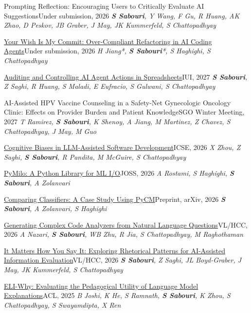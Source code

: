   \cventry
    {Prompting Reflection: Encouraging Users to Critically Evaluate AI Suggestions}{Under submission, 2026}
    {\textit{\textbf{S Sabouri}, Y Wang, F Gu, R Huang, AK Zhao, D Peskov, JB Graber, J May, JK Kummerfeld, S Chattopadhyay}}

  \cventry
    {\href{https://arxiv.org/abs/2610.36346}{Your Wish Is My Commit: Over-Compliant Refactoring in AI Coding Agents}}{Under submission, 2026}
    {\textit{H Jiang*, \textbf{S Sabouri}*, S Haghighi, S Chattopadhyay}}

  \cventry
    {\href{https://arxiv.org/abs/2604.20070}{Auditing and Controlling AI Agent Actions in Spreadsheets}}{IUI, 2027}
    {\textit{\textbf{S Sabouri}, Z Saghi, R Huang, S Maladi, E Eufracio, S Gulwani, S Chattopadhyay}}

  \cventry
    {AI-Assisted HPV Vaccine Counseling in a Safety-Net Gynecologic Oncology Clinic: Effects on Provider Burden and Patient Knowledge}{SGO Winter Meeting, 2027}
    {\textit{T Ramirez, \textbf{S Sabouri}, K Shenoy, A Jiang, M Martinez, Z Chavez, S Chattopadhyay, J May, M Guo}}

  \cventry
    {\href{https://arxiv.org/abs/2601.08045}{Cognitive Biases in LLM-Assisted Software Development}}{ICSE, 2026}
    {\textit{X Zhou, Z Saghi, \textbf{S Sabouri}, R Pandita, M McGuire, S Chattopadhyay}}

  \cventry
    {\href{https://joss.theoj.org/papers/10.21105/joss.08858}{PyMilo: A Python Library for ML I/O}}{JOSS, 2026}
    {\textit{A Rostami, S Haghighi, \textbf{S Sabouri}, A Zolanvari}}

  \cventry
    {\href{https://arxiv.org/abs/2602.13482}{Comparing Classifiers: A Case Study Using PyCM}}{Preprint, arXiv, 2026}
    {\textit{\textbf{S Sabouri}, A Zolanvari, S Haghighi}}

  \cventry
    {\href{https://arxiv.org/abs/2605.09304}{Generating Complex Code Analyzers from Natural Language Questions}}{VL/HCC, 2026}
    {\textit{A Nazari, \textbf{S Sabouri}, WB Zhu, R Jia, S Chattopadhyay, M Raghothaman}}

  \cventry
    {\href{https://arxiv.org/pdf/2607.17627}{It Matters How You Say It: Exploring Rhetorical Patterns for AI-Assisted Information Evaluation}}{VL/HCC, 2026}
    {\textit{\textbf{S Sabouri}, Z Saghi, JL Boyd-Graber, J May, JK Kummerfeld, S Chattopadhyay}}

  \cventry
    {\href{https://arxiv.org/pdf/2506.14200}{ELI-Why: Evaluating the Pedagogical Utility of Language Model Explanations}}{ACL, 2025}
    {\textit{B Joshi, K He, S Ramnath, \textbf{S Sabouri}, K Zhou, S Chattopadhyay, S Swayamdipta, X Ren}}

